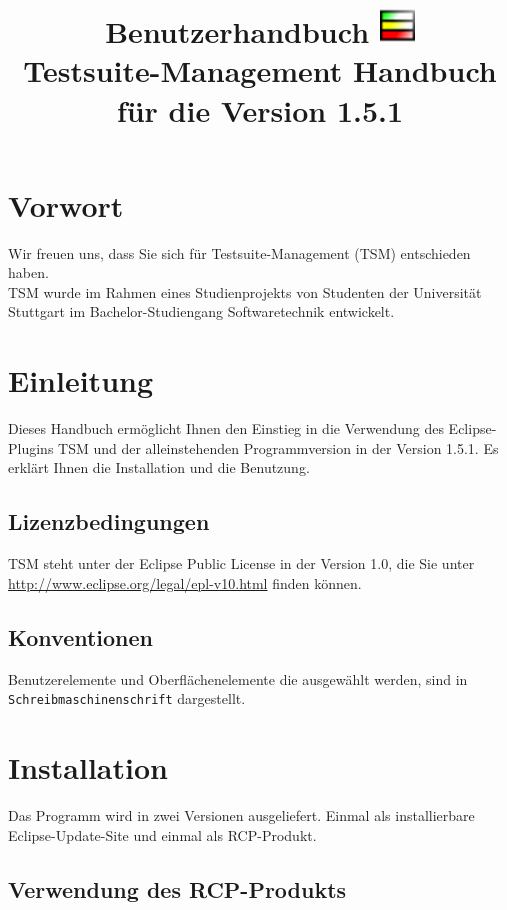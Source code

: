 \documentclass[11pt,a4paper,titlepage]{article}
\title{{\Huge Benutzerhandbuch} \linebreak \linebreak
\includegraphics[width= 35px]{BilderHandbuch/icon32.png} \\
\textbf{Testsuite-Management}
\linebreak \linebreak Handbuch für die Version 1.5.1}
\begin{document}
\maketitle
\pagebreak

\tableofcontents
\pagebreak

\section{Vorwort}
Wir freuen uns, dass Sie sich für Testsuite-Management (TSM) entschieden haben.\\
TSM wurde im Rahmen eines Studienprojekts von Studenten der Universität Stuttgart im Bachelor-Studiengang Softwaretechnik entwickelt.

\section{Einleitung}
Dieses Handbuch ermöglicht Ihnen den Einstieg in die Verwendung des Eclipse-Plugins TSM und der alleinstehenden Programmversion in der Version 1.5.1. Es erklärt Ihnen die Installation und die Benutzung.\\


\subsection{Lizenzbedingungen}
TSM steht unter der Eclipse Public License in der Version 1.0, die Sie unter \href{http://www.eclipse.org/legal/epl-v10.html}{http://www.eclipse.org/legal/epl-v10.html} finden können.

\subsection{Konventionen}
Benutzerelemente und Oberflächenelemente die ausgewählt werden, sind in \texttt{Schreibmaschinenschrift} dargestellt.

\section{Installation}
Das Programm wird in zwei Versionen ausgeliefert. Einmal als installierbare Eclipse-Update-Site und einmal als RCP-Produkt. \\


\subsection{Verwendung des RCP-Produkts}
\end{document}
